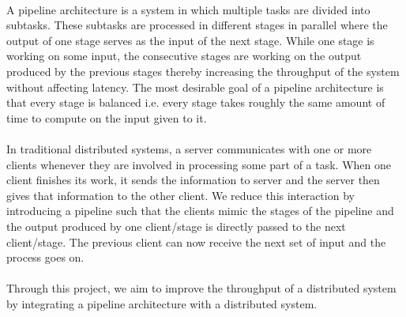 \vspace*{5mm}

\paragraph*{} {
	A pipeline architecture is a system in which multiple tasks are divided into subtasks. These subtasks are processed in different stages in parallel where the output of one stage serves as the input of the next stage. While one stage is working on some input, the consecutive stages are working on the output produced by the previous stages thereby increasing the throughput of the system without affecting latency. The most desirable goal of a pipeline architecture is that every stage is balanced i.e. every stage takes roughly the same amount of time to compute on the input given to it.
}

\paragraph*{} {
	In traditional distributed systems, a server communicates with one or more clients whenever they are involved in processing some part of a task. When one client finishes its work, it sends the information to server and the server then gives that information to the other client. We reduce this interaction by introducing a pipeline such that the clients mimic the stages of the pipeline and the output produced by one client/stage is directly passed to the next client/stage. The previous client can now receive the next set of input and the process goes on. 
}

\paragraph*{} {
	Through this project, we aim to improve the throughput of a distributed system by integrating a pipeline architecture with a distributed system. 
}